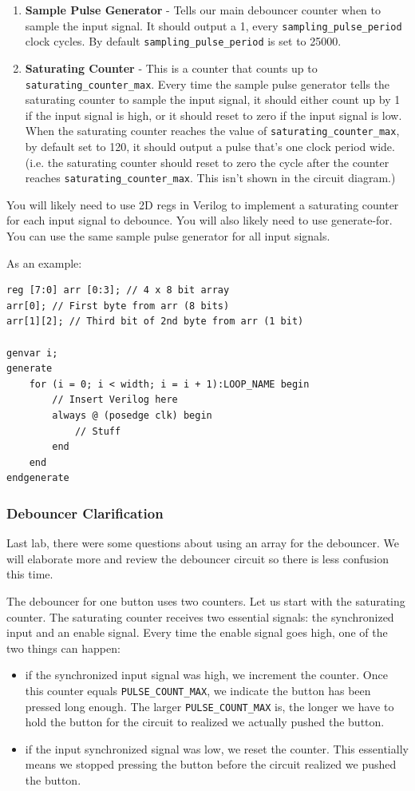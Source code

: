 \documentclass[11pt]{article}
\begin{document}
\begin{enumerate}
	\item \textbf{Sample Pulse Generator} - Tells our main debouncer counter when to sample the input signal. It should output a 1, every \verb|sampling_pulse_period| clock cycles. By default \verb|sampling_pulse_period| is set to 25000.
	
	\item \textbf{Saturating Counter} - This is a counter that counts up to \verb|saturating_counter_max|. Every time the sample pulse generator tells the saturating counter to sample the input signal, it should either count up by 1 if the input signal is high, or it should reset to zero if the input signal is low. When the saturating counter reaches the value of \verb|saturating_counter_max|, by default set to 120, it should output a pulse that's one clock period wide. (i.e. the saturating counter should reset to zero the cycle after the counter reaches \verb|saturating_counter_max|. This isn't shown in the circuit diagram.)
\end{enumerate}

You will likely need to use 2D regs in Verilog to implement a saturating counter for each input signal to debounce. You will also likely need to use generate-for. You can use the same sample pulse generator for all input signals.

As an example:

\begin{verbatim}
reg [7:0] arr [0:3]; // 4 x 8 bit array
arr[0]; // First byte from arr (8 bits)
arr[1][2]; // Third bit of 2nd byte from arr (1 bit)

genvar i;
generate
	for (i = 0; i < width; i = i + 1):LOOP_NAME begin
		// Insert Verilog here
		always @ (posedge clk) begin
			// Stuff
		end
	end
endgenerate
\end{verbatim}

\subsubsection{Debouncer Clarification}
Last lab, there were some questions about using an array for the debouncer. We will elaborate more and review the debouncer circuit so there is less confusion this time. 

The debouncer for one button uses two counters. Let us start with the saturating counter. The saturating counter receives two essential signals: the synchronized input and an enable signal. Every time the enable signal goes high, one of the two things can happen:
\begin{itemize}
\item if the synchronized input signal was high, we increment the counter. Once this counter equals \verb|PULSE_COUNT_MAX|, we indicate the button has been pressed long enough. The larger \verb|PULSE_COUNT_MAX| is, the longer we have to hold the button for the circuit to realized we actually pushed the button.
\item if the input synchronized signal was low, we reset the counter. This essentially means we stopped pressing the button before the circuit realized we pushed the button.
\end{itemize}
\end{document}
